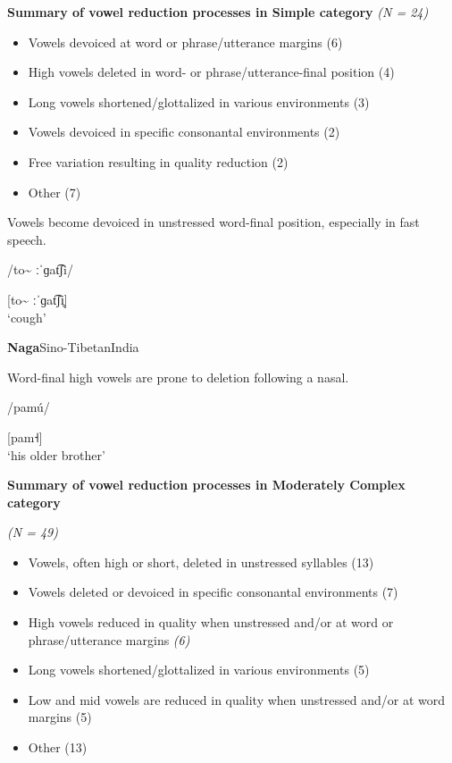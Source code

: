 \ea\label{ex:6.16}
  \textbf{Summary of vowel reduction processes in Simple category} \textit{(N = 24)}

\begin{itemize}
\item Vowels devoiced at word or phrase/utterance margins {(6)}
\item High vowels deleted in word- or phrase/utterance-final position {(4)}
\item Long vowels shortened/glottalized in various environments {(3)}
\item Vowels devoiced in specific consonantal environments {(2)}
\item Free variation resulting in quality reduction {(2)}
\item Other {(7)}
\end{itemize}

\ea{}

Vowels become devoiced in unstressed word-final position, especially in fast speech.

/to\~{} ːˈɡat͡ʃi/

[to\~{} ːˈɡat͡ʃi̥]\\
\glt ‘cough’
\citep[60-1]{Facundes2000}

\ex{} \textbf{Naga}{Sino-Tibetan}{India}

Word-final high vowels are prone to deletion following a nasal.

/pamú/

[pam˧]\\
\glt ‘his older brother’
\citep[369]{Teo2012}
\z
\z

\ea\label{ex:6.17}
  \textbf{Summary of vowel reduction processes in Moderately Complex category} 

\textit{(N = 49)}

\begin{itemize}
\item Vowels, often high or short, deleted in unstressed syllables (13)
\item Vowels deleted or devoiced in specific consonantal environments (7)
\item High vowels reduced in quality when unstressed and/or at word or phrase/utterance margins \textit{(6)}
\item Long vowels shortened/glottalized in various environments (5)
\item Low and mid vowels are reduced in quality when unstressed and/or at word margins (5)
\item Other {(13)}
\end{itemize}

